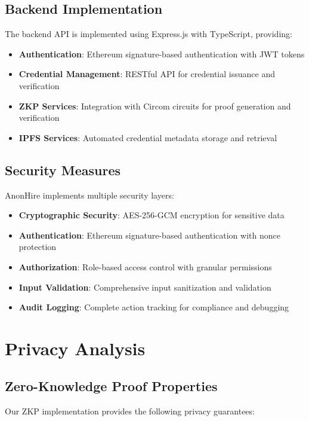 \documentclass[conference]{IEEEtran}
\begin{document}
\subsection{Backend Implementation}

The backend API is implemented using Express.js with TypeScript, providing:

\begin{itemize}
\item \textbf{Authentication}: Ethereum signature-based authentication with JWT tokens
\item \textbf{Credential Management}: RESTful API for credential issuance and verification
\item \textbf{ZKP Services}: Integration with Circom circuits for proof generation and verification
\item \textbf{IPFS Services}: Automated credential metadata storage and retrieval
\end{itemize}

\subsection{Security Measures}

AnonHire implements multiple security layers:

\begin{itemize}
\item \textbf{Cryptographic Security}: AES-256-GCM encryption for sensitive data
\item \textbf{Authentication}: Ethereum signature-based authentication with nonce protection
\item \textbf{Authorization}: Role-based access control with granular permissions
\item \textbf{Input Validation}: Comprehensive input sanitization and validation
\item \textbf{Audit Logging}: Complete action tracking for compliance and debugging
\end{itemize}

\section{Privacy Analysis}

\subsection{Zero-Knowledge Proof Properties}

Our ZKP implementation provides the following privacy guarantees:
\end{document}
